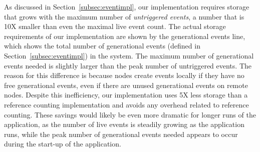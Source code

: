 As discussed in Section~\ref{subsec:eventimpl}, our implementation
requires storage that grows with the maximum number of {\em untriggered events}, a number
that is 10X smaller than even the maximal live event count.  The actual storage
requirements of our implementation are shown by the generational events line,
which shows the total number of generational events (defined in Section~\ref{subsec:eventimpl}) 
in the system.
The maximum number of generational events needed is slightly larger than the peak number of untriggered events. 
The reason for this difference is because nodes create events locally if they have
no free generational events, even if there are unused generational events on remote nodes.
Despite this inefficiency, our implementation uses 5X less storage
than a reference counting implementation and avoids any overhead related to 
reference counting.  These savings would likely be even more dramatic for longer 
runs of the application, as the number of live events is steadily growing as the
application runs, while the peak number of generational events needed appears to 
occur during the start-up of the application.




